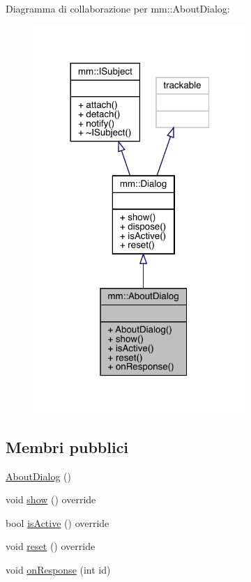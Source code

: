 Diagramma di collaborazione per mm\+:\+:About\+Dialog\+:\nopagebreak
\begin{figure}[H]
\begin{center}
\leavevmode
\includegraphics[width=228pt]{da/dca/classmm_1_1_about_dialog__coll__graph}
\end{center}
\end{figure}
\subsection*{Membri pubblici}
\begin{DoxyCompactItemize}
\item 
\hyperlink{classmm_1_1_about_dialog_a489ffce563c6dae1dfef30518a778197}{About\+Dialog} ()
\item 
void \hyperlink{classmm_1_1_about_dialog_a9e06dc12f6950b74ccf6ccece693f108}{show} () override
\item 
bool \hyperlink{classmm_1_1_about_dialog_adc8aec0378d9d146c78eaf9a204dbf27}{is\+Active} () override
\item 
void \hyperlink{classmm_1_1_about_dialog_a21f5b0a7c9d8e43baab78e073d7ade2b}{reset} () override
\item 
void \hyperlink{classmm_1_1_about_dialog_a9a5feecb03e737d3bdbbf2a97dd7fbc4}{on\+Response} (int id)
\end{DoxyCompactItemize}


